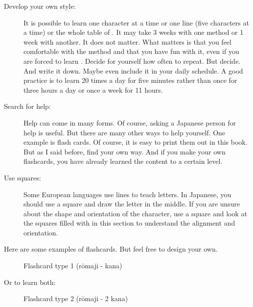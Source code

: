 \begin{description}

\item[Develop your own style:] It is possible to learn one character at a time
        or one line (five characters at a time) or the whole table of
        \textbf{\jtopic}. It may take 3 weeks with one method or 1 week with
        another. It does not matter. What matters is that you feel comfortable
        with the method and that you have fun with it, even if you are forced
        to learn \textbf{\jtopic}. Decide for yourself how often to repeat. But
        decide. And write it down. Maybe even include it in your daily
        schedule. A good practice is to learn \textbf{\jtopic} 20 times a day
        for five minutes rather than once for three hours a day or once a week
        for 11 hours.

\item[Search for help:] Help can come in many forms. Of course, asking a
        Japanese person for help is useful. But there are many other ways to
        help yourself. One example is flash cards. Of course, it is easy to
        print them out in this book. But as I said before, find your own way.
        And if you make your own flashcards, you have already learned the
        content to a certain level.

\item[Use squares:] Some European languages use lines to teach letters. In
        Japanese, you should use a square and draw the letter in the middle. If
        you are unsure about the shape and orientation of the character, use a
        square and look at the squares filled with \textbf{\jtopic} in this
        section to understand the alignment and orientation.

\end{description}

\newpage

Here are some examples of flashcards. But feel free to design your own.

\begin{figure}[H]
        
        \caption{Flashcard type 1 (rōmaji - kana) }
        \label{fig:FlashCardTypeOne}
\end{figure}

\normalsize

Or to learn both:

\begin{figure}[H]
        
        \caption{Flashcard type 2 (rōmaji - 2 kana)}
        \label{fig:FlashCardTypeTwo}
\end{figure}

